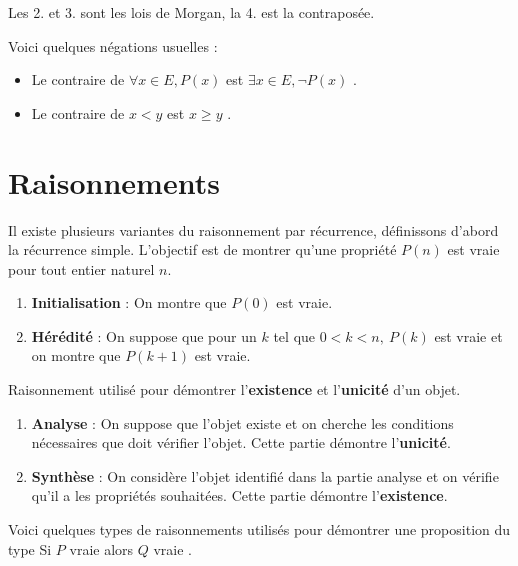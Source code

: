 \begin{remark}
    Les 2. et 3. sont les lois de Morgan, la 4. est la contraposée.
\end{remark}

\par \noindent Voici quelques négations usuelles :
\begin{itemize}
    \item Le contraire de \og $\forall x \in E, P(x)$ \fg est \og $\exists x \in E, \neg P(x)$ \fg.
    \item Le contraire de \og $x < y$ \fg est \og $x \geq y$ \fg.
\end{itemize}

\section{Raisonnements}

\begin{definition}
    Il existe plusieurs variantes du raisonnement par récurrence, définissons d'abord la récurrence simple. L'objectif est de montrer qu'une propriété $P(n)$ est vraie pour tout entier naturel $n$. 
    \begin{enumerate}
        \item \textbf{Initialisation} : On montre que $P(0)$ est vraie.
        \item \textbf{Hérédité} : On suppose que pour un $k$ tel que $0 < k < n,\ P(k)$ est vraie et on montre que $P(k+1)$ est vraie.
    \end{enumerate}
\end{definition}

\begin{definition}
	Raisonnement utilisé pour démontrer l'\textbf{existence} et l'\textbf{unicité} d'un objet.
	\begin{enumerate}
		\item \textbf{Analyse} : On suppose que l'objet existe et on cherche les conditions nécessaires que doit vérifier l'objet. Cette partie démontre l'\textbf{unicité}.
		\item \textbf{Synthèse} : On considère l'objet identifié dans la partie analyse et on vérifie qu'il a les propriétés souhaitées. Cette partie démontre l'\textbf{existence}.
	\end{enumerate}
\end{definition}

Voici quelques types de raisonnements utilisés pour démontrer une proposition du type \og Si $P$ vraie alors $Q$ vraie \fg.

